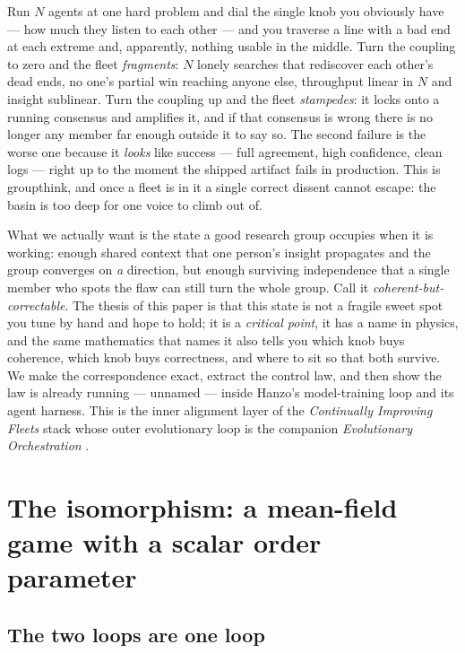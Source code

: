 \documentclass[11pt]{article}
\begin{document}
Run $N$ agents at one hard problem and dial the single knob you obviously have --- how much they listen to each
other --- and you traverse a line with a bad end at each extreme and, apparently, nothing usable in the middle.
Turn the coupling to zero and the fleet \emph{fragments}: $N$ lonely searches that rediscover each other's dead
ends, no one's partial win reaching anyone else, throughput linear in $N$ and insight sublinear. Turn the
coupling up and the fleet \emph{stampedes}: it locks onto a running consensus and amplifies it, and if that
consensus is wrong there is no longer any member far enough outside it to say so. The second failure is the
worse one because it \emph{looks} like success --- full agreement, high confidence, clean logs --- right up to
the moment the shipped artifact fails in production. This is groupthink, and once a fleet is in it a single
correct dissent cannot escape: the basin is too deep for one voice to climb out of.

What we actually want is the state a good research group occupies when it is working: enough shared context that
one person's insight propagates and the group converges on \emph{a} direction, but enough surviving
independence that a single member who spots the flaw can still turn the whole group. Call it
\emph{coherent-but-correctable}. The thesis of this paper is that this state is not a fragile sweet spot you
tune by hand and hope to hold; it is a \emph{critical point}, it has a name in physics, and the same
mathematics that names it also tells you which knob buys coherence, which knob buys correctness, and where to
sit so that both survive. We make the correspondence exact, extract the control law, and then show the law is
already running --- unnamed --- inside Hanzo's model-training loop and its agent harness. This is the inner
alignment layer of the \emph{Continually Improving Fleets} stack whose outer evolutionary loop is the companion
\emph{Evolutionary Orchestration} \cite{hanzo-evolutionary-orchestration}.

\section{The isomorphism: a mean-field game with a scalar order parameter}
\label{sec:iso}

\subsection{The two loops are one loop}
\end{document}
